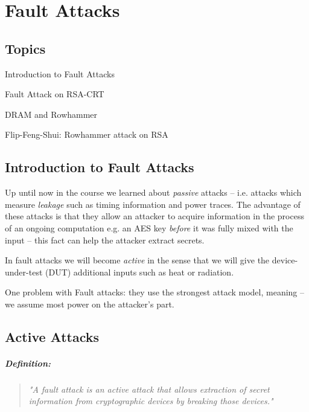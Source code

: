 \chapter{Fault Attacks} \label{c9_ninthchapter:cha}

\begin{centering}
	\section*{Topics} \label{sec:topics}
		\begin{enumerate}
		\end{enumerate}
\end{centering}
\newpage

\section*{Introduction to Fault Attacks} \label{sec:introduction_to_fault_attacks}
Up until now in the course we learned about \emph{passive} attacks -- i.e. attacks which measure \emph{leakage} such as timing information and power traces. The advantage of these attacks is that they allow an attacker to acquire information in the process of an ongoing computation e.g. an AES key \emph{before} it was fully mixed with the input -- this fact can help the attacker extract secrets.

In fault attacks we will become \emph{active} in the sense that we will give the device-under-test (DUT) additional inputs such as heat or radiation.

One problem with Fault attacks: they use the strongest attack model, meaning -- we assume most power on the attacker's part.

\section{Active Attacks} \label{sec:active_attacks}
\paragraph{Definition:}
\begin{quote}
	\textit{"A fault attack is an active attack that allows extraction of secret information from cryptographic devices by breaking those devices."}
\end{quote}


